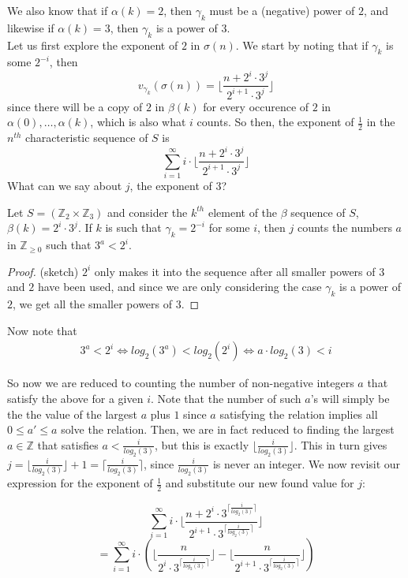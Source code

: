 We also know that if $\alpha(k)=2$, then $\gamma_k$ must be a (negative) power of $2$, and likewise if $\alpha(k)=3$, then $\gamma_k$ is a power of $3$.\\

 Let us first explore the exponent of $2$ in $\sigma(n)$. We start by noting that if $\gamma_k$ is some $2^{-i}$, then \[v_{\gamma_k}(\sigma(n)) =\lfloor \frac{n + 2^i\cdot 3 ^j}{2^{i+1} \cdot 3^j} \rfloor \] since there will be a copy of $2$ in $\beta(k)$ for every occurence of $2$ in $\alpha(0),\ldots,\alpha(k)$, which is also what $i$ counts. So then, the exponent of $\frac{1}{2}$ in the $n^{th}$ characteristic sequence of $S$ is \[ \sum_{i=1}^\infty i \cdot \lfloor\frac{n + 2^i \cdot 3^j}{2^{i+1}\cdot 3^j} \rfloor\] What can we say about $j$, the exponent of $3$? 

\begin{lemma*}
Let $S = (\mathbb{Z}_{2} \times \mathbb{Z}_{3}) $ and consider the $k^{th}$ element of the $\beta$ sequence of $S$, $\beta(k) = 2^i \cdot 3^j$. If $k$ is such that $\gamma_k=2^{-i}$ for some $i$, then $j$ counts the numbers $a$ in $\mathbb{Z}_{\geq 0}$ such that $3^a < 2^{i}$.
\end{lemma*}

\begin{proof}
(sketch) $2^i$ only makes it into the sequence after all smaller powers of $3$ and $2$ have been used, and since we are only considering the case $\gamma_k$ is a power of $2$, we get all the smaller powers of $3$.
\end{proof}

 Now note that  
\begin{align}
3^a < 2^i
 \iff
 log_2(3^a) < log_2(2^i)
\iff  
a \cdot log_2(3) < i
\end{align}

So now we are reduced to counting the number of non-negative integers $a$ that satisfy the above for a given $i$.  Note that the number of such $a$'s will simply be the the value of the largest $a$ plus $1$ since $a$ satisfying the relation implies all $0 \leq a' \leq a$ solve the relation. Then, we are in fact reduced to finding the largest $a \in \mathbb{Z}$ that satisfies $a < \frac{i}{log_2(3)}$, but this is exactly $\lfloor \frac{i}{log_2(3)}\rfloor$. This in turn gives $j =  \lfloor \frac{i}{log_2(3)}\rfloor + 1= \lceil \frac{i}{log_2(3)}\rceil$, since $\frac{i}{log_2(3)}$ is never an integer. We now revisit our expression for the exponent of $\frac{1}{2}$ and substitute our new found value for $j$:
 
\[\sum_{i=1}^\infty i \cdot \lfloor\frac{n + 2^i \cdot 3^{\lceil \frac{i}{log_2(3)}\rceil}}{2^{i+1}\cdot 3^{\lceil \frac{i}{log_2(3)}\rceil}} \rfloor\]
\[=\sum_{i=1}^\infty i \cdot (\lfloor\frac{n}{2^i \cdot 3^{\lceil \frac{i}{log_2(3)}\rceil }}\rfloor -  \lfloor\frac{n}{2^{i+1}\cdot 3^{\lceil \frac{i}{log_2(3)}\rceil}} \rfloor)\]




